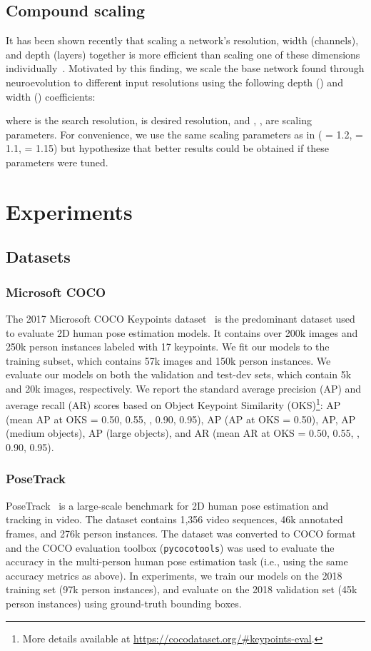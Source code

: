\documentclass{ieeeaccess}
\begin{document}
\subsection{Compound scaling} 
It has been shown recently that scaling a network's resolution, width (channels), and depth (layers) together is more efficient than scaling one of these dimensions individually~\cite{tan2019efficientnet}. Motivated by this finding, we scale the base network found through neuroevolution to different input resolutions using the following depth () and width () coefficients:


where  is the search resolution,  is desired resolution, and , ,  are scaling parameters. For convenience, we use the same scaling parameters as in \cite{tan2019efficientnet} ( = 1.2,  = 1.1,  = 1.15) but hypothesize that better results could be obtained if these parameters were tuned. 

\section{Experiments}
\vspace{4pt}
\subsection{Datasets}
\vspace{4pt}
\subsubsection{Microsoft COCO}
The 2017 Microsoft COCO Keypoints dataset~\cite{lin2014microsoft} is the predominant dataset used to evaluate 2D human pose estimation models. It contains over 200k images and 250k person instances labeled with 17 keypoints. We fit our models to the training subset, which contains 57k images and 150k person instances. We evaluate our models on both the validation and test-dev sets, which contain 5k and 20k images, respectively. We report the standard average precision (AP) and average recall (AR) scores based on Object Keypoint Similarity (OKS)\footnote{More details available at \href{https://cocodataset.org/\#keypoints-eval}{https://cocodataset.org/\#keypoints-eval}.}: AP (mean AP at OKS = 0.50, 0.55, , 0.90, 0.95), AP (AP at OKS = 0.50), AP, AP (medium objects), AP (large objects), and AR (mean AR at OKS = 0.50, 0.55, , 0.90, 0.95).

\subsubsection{PoseTrack} 
PoseTrack~\cite{andriluka2018posetrack} is a large-scale benchmark for 2D human pose estimation and tracking in video. The dataset contains 1,356 video sequences, 46k annotated frames, and 276k person instances. The dataset was converted to COCO format and the COCO evaluation toolbox (\texttt{pycocotools}) was used to evaluate the accuracy in the multi-person human pose estimation task (i.e., using the same accuracy metrics as above). In experiments, we train our models on the 2018 training set (97k person instances), and evaluate on the 2018 validation set (45k person instances) using ground-truth bounding boxes.
\end{document}
